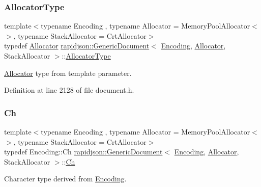 \subsubsection{\texorpdfstring{AllocatorType}{AllocatorType}}
{\footnotesize\ttfamily template$<$typename Encoding , typename Allocator  = Memory\+Pool\+Allocator$<$$>$, typename Stack\+Allocator  = Crt\+Allocator$>$ \\
typedef \mbox{\hyperlink{classrapidjson_1_1_allocator}{Allocator}} \mbox{\hyperlink{classrapidjson_1_1_generic_document}{rapidjson\+::\+Generic\+Document}}$<$ \mbox{\hyperlink{classrapidjson_1_1_encoding}{Encoding}}, \mbox{\hyperlink{classrapidjson_1_1_allocator}{Allocator}}, Stack\+Allocator $>$\+::\mbox{\hyperlink{classrapidjson_1_1_generic_value_a5d47340c96346c5028fee4c9068d783d}{Allocator\+Type}}}



\mbox{\hyperlink{classrapidjson_1_1_allocator}{Allocator}} type from template parameter. 



Definition at line 2128 of file document.\+h.

\mbox{\label{classrapidjson_1_1_generic_document_a8367a827588dd91d02e21ef945bec9f5}} 
\subsubsection{\texorpdfstring{Ch}{Ch}}
{\footnotesize\ttfamily template$<$typename Encoding , typename Allocator  = Memory\+Pool\+Allocator$<$$>$, typename Stack\+Allocator  = Crt\+Allocator$>$ \\
typedef Encoding\+::\+Ch \mbox{\hyperlink{classrapidjson_1_1_generic_document}{rapidjson\+::\+Generic\+Document}}$<$ \mbox{\hyperlink{classrapidjson_1_1_encoding}{Encoding}}, \mbox{\hyperlink{classrapidjson_1_1_allocator}{Allocator}}, Stack\+Allocator $>$\+::\mbox{\hyperlink{classrapidjson_1_1_generic_value_adcdbc7fa85a9a41b78966d7e0dcc2ac4}{Ch}}}



Character type derived from \mbox{\hyperlink{classrapidjson_1_1_encoding}{Encoding}}. 



